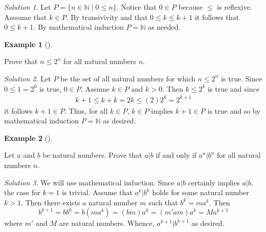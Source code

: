 \documentclass[
  twoside,
  12pt,
  letterpaper]{article}
\theoremstyle{definition}
\newtheorem{example}{Example}[section]
\theoremstyle{definition}
\theoremstyle{definition}
\theoremstyle{plain}
\theoremstyle{plain}
\theoremstyle{remark}
\newtheorem*{solution}{Solution}
\begin{document}
\begin{solution}

Let \(P=\{n\in \mathbb{N} \mid 0 \leq n \}\). Notice that \(0\in P\)
because \(\leq\) is reflexive. Asssume that \(k\in P\). By transivivity
and that \(0\leq k \leq k+1\) it follows that \(0\leq k+1.\) By
mathematical induction \(P=\mathbb{N}\) as needed.

\end{solution}

\begin{example}[]\protect\hypertarget{exm-ordering-one}{}\label{exm-ordering-one}

Prove that \(n\leq 2^n\) for all natural numbers \(n.\)

\end{example}

\begin{solution}

Let \(P\) be the set of all natural numbers for which \(n\leq 2^n\) is
true. Since \(0\leq 1=2^0\) is true, \(0\in P.\) Assume \(k\in P\) and
\(k>0\). Then \(k\leq 2^k\) is true and since \begin{align}
k+1 \leq k+k = 2k \leq (2) 2^k = 2^{k+1}
\end{align} it follows \(k+1\in P.\) Thus, for all \(k\in P\),
\(k\in P\) implies \(k+1\in P\) is true and so by mathematical induction
\(P=\mathbb{N}\) as desired.

\end{solution}

\begin{example}[]\protect\hypertarget{exm-div-powers}{}\label{exm-div-powers}

Let \(a\) and \(b\) be natural numbers. Prove that \(a|b\) if and only
if \(a^n|b^n\) for all natural numbers \(n.\)

\end{example}

\begin{solution}

We will use mathematical induction. Since \(a|b\) certainly implies
\(a|b,\) the case for \(k=1\) is trivial. Assume that \(a^k|b^k\) holds
for some natural number \(k>1\). Then there exists a natural number
\(m\) such that \(b^k=m a^k.\) Then \begin{equation}
b^{k+1}=b b^k
=b \left(m a^k\right)
=(b m )a^k
=(m' a m )a^k
=M a^{k+1}
\end{equation} where \(m'\) and \(M\) are natural numbers. Whence,
\(a^{k+1}|b^{k+1}\) as desired.

\end{solution}
\end{document}
